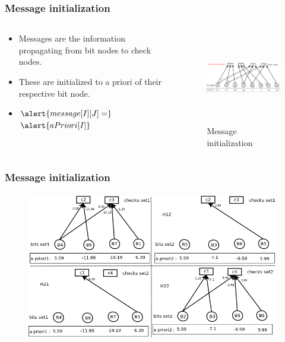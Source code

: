 \documentclass[xcolor=dvipsname]
{beamer}
\begin{document}
\begin{frame}[t]
\frametitle{ Message initialization }  
\begin{columns}[totalwidth=\textwidth]
	\begin{column}{0.4\textwidth}
	\centering
	\begin{itemize}
	\item Messages are the information propagating from bit nodes to check nodes.
	\item These are initialized to a priori of their respective bit node.	
	\item 	$ \alert{message[I][J] =} 
	$
	$
	\alert{aPriori[I]} 
	$ 
	\end{itemize}
 
			
	\end{column}%
	   		
	\begin{column}{0.6\textwidth}
	\centering
	\begin{figure}
	\includegraphics[height=4cm,width=7cm]{minSum3}
	\caption{ Message initialization }
	\end{figure}
	\end{column}%
\end{columns}
\end{frame}


\begin{frame}[t]
\frametitle{ Message initialization }  
\vspace{-5mm}
\begin{figure}
       \includegraphics[height=6.5cm,width=11cm]{minSumModified2}
       \end{figure}
\end{frame}
\end{document}
